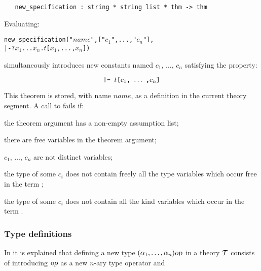 \begin{holboxed}
\begin{verbatim}
   new_specification : string * string list * thm -> thm
\end{verbatim}
\end{holboxed}
%
Evaluating:
{
\newcommand{\cone}{\ensuremath{c_1}}
\newcommand{\cn}{\ensuremath{c_n}}
\newcommand{\xone}{\ensuremath{x_1}}
\newcommand{\xn}{\ensuremath{x_n}}
\begin{alltt}
   new_specification("\(\mathit{name}\)", ["\cone", ..., "\cn"],
                     |- ?\xone ... \xn. \(t\)[\xone, ..., \xn])
\end{alltt}
}
simultaneously  introduces  new constants  named $c_1$, $\dots$,
$c_n$ satisfying the property:

\[ \ml{|- }t\ml{[}c_1\ml{,}\ \ldots\ \ml{,}c_n\ml{]} \]

\noindent This theorem is stored,
with name $name$, as a definition in the current theory segment. A call to
 fails if:

\begin{myenumerate}
\item the theorem argument has a non-empty assumption list;
\item there are free variables in the theorem argument;
\item $c_1$, $\dots$, $c_n$ are not distinct variables;
\item the type of some $c_i$ does not contain freely all the type
variables which occur free in the term
;
\item the type of some $c_i$ does not contain all the kind
variables which occur in the term
.
\end{myenumerate}
%

\subsubsection{Type definitions}
\label{type-defs}

%
%
In \LOGIC{} it is explained that
defining
%
%
a new type $(\alpha_1,\ldots,\alpha_n)\textsl{op}$ in a theory ${\cal T}$
consists of introducing $\textsl{op}$ as a new $n$-ary type operator and

